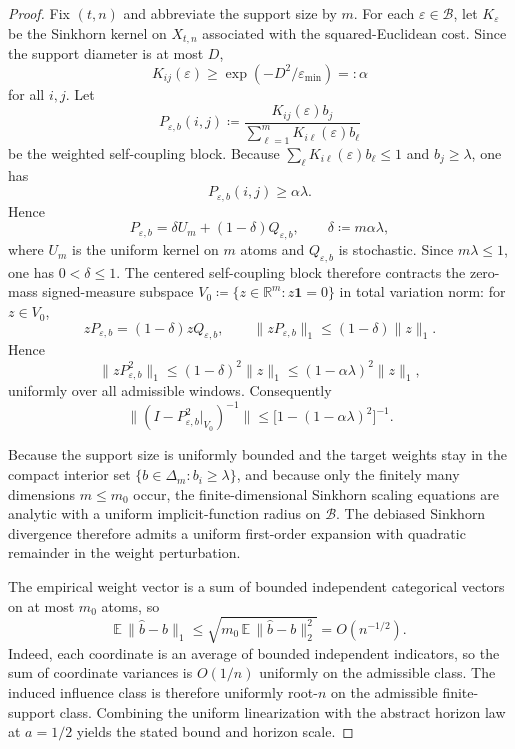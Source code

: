 \begin{proof}
Fix $(t,n)$ and abbreviate the support size by $m$. For each $\varepsilon\in\mathcal B$, let
$K_{\varepsilon}$ be the Sinkhorn kernel on $X_{t,n}$ associated with the
squared-Euclidean cost. Since the support diameter is at most $D$,
\[
  K_{ij}(\varepsilon) \ge \exp(-D^2/\varepsilon_{\min}) =: \alpha
\]
for all $i,j$. Let
\[
  P_{\varepsilon,b}(i,j)
  \coloneqq
  \frac{K_{ij}(\varepsilon)b_j}{\sum_{\ell=1}^m K_{i\ell}(\varepsilon)b_\ell}
\]
be the weighted self-coupling block. Because $\sum_{\ell}K_{i\ell}(\varepsilon)b_\ell\le 1$
and $b_j\ge\lambda$, one has
\[
  P_{\varepsilon,b}(i,j)\ge \alpha\lambda.
\]
Hence
\[
  P_{\varepsilon,b}=\delta U_m + (1-\delta)Q_{\varepsilon,b},
  \qquad
  \delta\coloneqq m\alpha\lambda,
\]
where $U_m$ is the uniform kernel on $m$ atoms and $Q_{\varepsilon,b}$ is
stochastic. Since $m\lambda\le 1$, one has $0<\delta\le 1$. The centered
self-coupling block therefore contracts the zero-mass signed-measure subspace
$V_0\coloneqq\{z\in\mathbb R^m:z\mathbf 1=0\}$ in total variation norm:
for $z\in V_0$,
\[
  zP_{\varepsilon,b}=(1-\delta)zQ_{\varepsilon,b},
  \qquad
  \|zP_{\varepsilon,b}\|_1\le (1-\delta)\|z\|_1.
\]
Hence
\[
  \|zP_{\varepsilon,b}^2\|_1\le (1-\delta)^2\|z\|_1
  \le (1-\alpha\lambda)^2\|z\|_1,
\]
uniformly over all admissible windows. Consequently
\[
  \bigl\|(I-P_{\varepsilon,b}^2|_{V_0})^{-1}\bigr\|
  \le \bigl[1-(1-\alpha\lambda)^2\bigr]^{-1}.
\]

Because the support size is uniformly bounded and the target weights stay in the
compact interior set $\{b\in\Delta_m:b_i\ge\lambda\}$, and because only the
finitely many dimensions $m\le m_0$ occur, the finite-dimensional Sinkhorn
scaling equations are analytic with a uniform implicit-function radius on
$\mathcal B$. The debiased Sinkhorn divergence therefore admits a uniform
first-order expansion with quadratic remainder in the weight perturbation.

The empirical weight vector is a sum of bounded independent categorical vectors
on at most $m_0$ atoms, so
\[
  \mathbb E\,\|\widehat b-b\|_1
  \le \sqrt{m_0\,\mathbb E\,\|\widehat b-b\|_2^2}
  = O(n^{-1/2}).
\]
Indeed, each coordinate is an average of bounded independent indicators, so the
sum of coordinate variances is $O(1/n)$ uniformly on the admissible class.
The induced influence class is therefore uniformly root-$n$ on the admissible
finite-support class. Combining the uniform linearization with the abstract
horizon law at $a=1/2$ yields the stated bound and horizon scale.
\end{proof}

